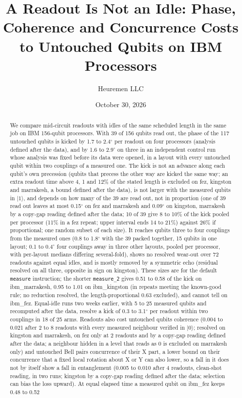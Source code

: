 \documentclass[reprint,amsmath,amssymb,aps,superscriptaddress,nofootinbib]{revtex4-2}
\begin{document}
\title{A Readout Is Not an Idle: Phase, Coherence and Concurrence Costs to Untouched Qubits on IBM Processors}

\author{Heuremen LLC}

\date{October 30, 2026}

\begin{abstract}
We compare mid-circuit readouts with idles of the same scheduled length in the same job on IBM 156-qubit processors. With 39 of 156 qubits read out, the phase of the 117 untouched qubits is kicked by 1.7 to 2.4$^\circ$ per readout on four processors (analysis defined after the data), and by 1.6 to 2.9$^\circ$ on three in an independent control run whose analysis was fixed before its data were opened, in a layout with every untouched qubit within two couplings of a measured one. The kick is not an advance along each qubit's own precession (qubits that precess the other way are kicked the same way; an extra readout time above 4, 1 and 12\% of the stated length is excluded on fez, kingston and marrakesh, a bound defined after the data), is not larger with the measured qubits in $|1\rangle$, and depends on how many of the 39 are read out, not in proportion (one of 39 read out leaves at most 0.15$^\circ$ on fez and marrakesh and 0.09$^\circ$ on kingston, marrakesh by a copy-gap reading defined after the data; 10 of 39 give 8 to 10\% of the kick pooled per processor (11\% in a fez repeat; upper interval ends 14 to 21\%) against 26\% if proportional; one random subset of each size). It reaches qubits three to four couplings from the measured ones (0.8 to 1.8$^\circ$ with the 39 packed together, 15 qubits in one layout; 0.1 to 0.4$^\circ$ four couplings away in three other layouts, pooled per processor, with per-layout medians differing several-fold), shows no resolved wear-out over 72 readouts against equal idles, and is mostly removed by a symmetric echo (residual resolved on all three, opposite in sign on kingston). These sizes are for the default \texttt{measure} instruction; the shorter \texttt{measure\_2} gives 0.51 to 0.58 of the kick on ibm\_marrakesh, 0.95 to 1.01 on ibm\_kingston (in repeats meeting the known-good rule; no reduction resolved, the length-proportional 0.63 excluded), and cannot tell on ibm\_fez. Equal-idle runs two weeks earlier, with 5 to 25 measured qubits and recomputed after the data, resolve a kick of 0.3 to 3.1$^\circ$ per readout within two couplings in 18 of 25 arms. Readouts also cost untouched qubits coherence (0.004 to 0.021 after 2 to 8 readouts with every measured neighbour verified in $|0\rangle$; resolved on kingston and marrakesh, on fez only at 2 readouts and by a copy-gap reading defined after the data; a neighbour hidden in a level that reads as 0 is excluded on marrakesh only) and untouched Bell pairs concurrence of their X part, a lower bound on their concurrence that a fixed local rotation about X or Y can also lower, so a fall in it does not by itself show a fall in entanglement (0.005 to 0.010 after 4 readouts, clean-shot reading, in two runs; kingston by a copy-gap reading defined after the data; selection can bias the loss upward). At equal elapsed time a measured qubit on ibm\_fez keeps 0.48 to 0.52 
\end{abstract}
\end{document}
